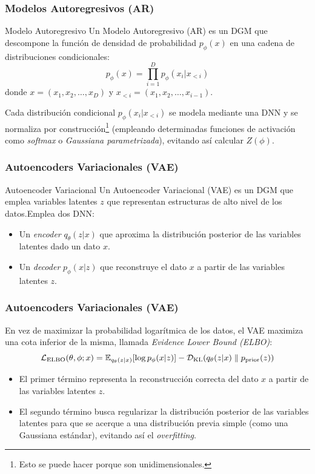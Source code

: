 \documentclass{beamer}
\begin{document}
\begin{frame}
	\frametitle{Modelos Autoregresivos (AR)}
	\begin{definitionblock}{Modelo Autoregresivo}
		Un Modelo Autoregresivo (AR) es un DGM que descompone la función de densidad de probabilidad $p_{\phi}(x)$ en una cadena de distribuciones condicionales:
		\begin{equation*}
			p_{\phi}(x) = \prod_{i=1}^{D} p_{\phi}(x_i | x_{<i})
		\end{equation*}
		donde $x=(x_1, x_2, \dots, x_D)$ y $x_{<i} = (x_1, x_2, \dots, x_{i-1})$.
	\end{definitionblock}\pause
	Cada distribución condicional $p_{\phi}(x_i | x_{<i})$ se modela mediante una DNN y se normaliza por construcción\footnote{Esto se puede hacer porque son unidimensionales.} (empleando determinadas funciones de activación como \emph{softmax} o \emph{Gaussiana parametrizada}), evitando así calcular $Z({\phi})$.
\end{frame}

\begin{frame}
	\frametitle{Autoencoders Variacionales (VAE)}
	\begin{definitionblock}{Autoencoder Variacional}
		Un Autoencoder Variacional (VAE) es un DGM que emplea variables latentes $z$ que representan estructuras de alto nivel de los datos.\pause Emplea dos DNN:
		\begin{itemize}
			\item Un \emph{encoder} $q_{\theta}(z|x)$ que aproxima la distribución posterior de las variables latentes dado un dato $x$.\pause
			\item Un \emph{decoder} $p_{\phi}(x|z)$ que reconstruye el dato $x$ a partir de las variables latentes $z$.
		\end{itemize}
	\end{definitionblock}
\end{frame}
\begin{frame}
	\frametitle{Autoencoders Variacionales (VAE)}

	En vez de maximizar la probabilidad logarítmica de los datos, el VAE maximiza una cota inferior de la misma, llamada \emph{Evidence Lower Bound (ELBO)}:
	\begin{equation*}
		\mathcal{L}_{\text{ELBO}}(\theta, \phi; x) = \mathbb{E}_{q_{\theta}(z|x)} [\log p_{\phi}(x|z)] - \mathcal{D}_{\text{KL}}(q_{\theta}(z|x) \parallel p_{\text{prior}}(z))
	\end{equation*}\pause
	\begin{itemize}
		\item El primer término representa la reconstrucción correcta del dato $x$ a partir de las variables latentes $z$.\pause
		\item El segundo término busca regularizar la distribución posterior de las variables latentes para que se acerque a una distribución previa simple (como una Gaussiana estándar), evitando así el \emph{overfitting}.
	\end{itemize}
\end{frame}
\end{document}

